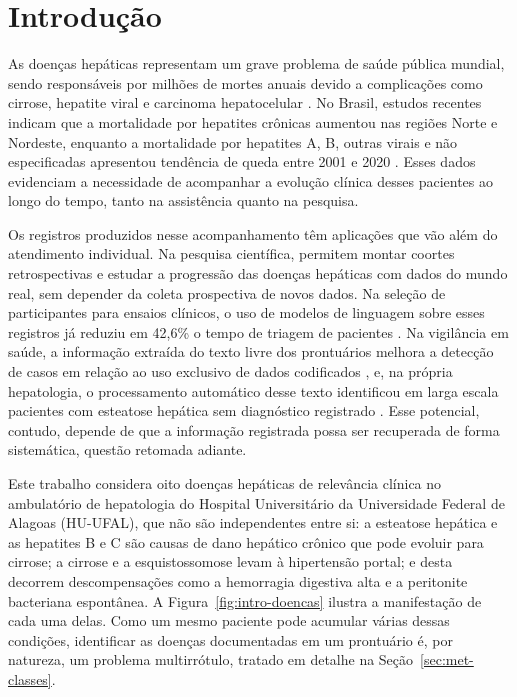 \chapter{Introdução}\label{cap:introducao}

As doenças hepáticas representam um grave problema de saúde pública mundial, sendo responsáveis por milhões de mortes anuais devido a complicações como cirrose, hepatite viral e carcinoma hepatocelular \citep{sousa2023}. No Brasil, estudos recentes indicam que a mortalidade por hepatites crônicas aumentou nas regiões Norte e Nordeste, enquanto a mortalidade por hepatites A, B, outras virais e não especificadas apresentou tendência de queda entre 2001 e 2020 \citep{sousa2023}. Esses dados evidenciam a necessidade de acompanhar a evolução clínica desses pacientes ao longo do tempo, tanto na assistência quanto na pesquisa.

Os registros produzidos nesse acompanhamento têm aplicações que vão além do atendimento individual. Na pesquisa científica, permitem montar coortes retrospectivas e estudar a progressão das doenças hepáticas com dados do mundo real, sem depender da coleta prospectiva de novos dados. Na seleção de participantes para ensaios clínicos, o uso de modelos de linguagem sobre esses registros já reduziu em 42,6\% o tempo de triagem de pacientes \citep{jin2024}. Na vigilância em saúde, a informação extraída do texto livre dos prontuários melhora a detecção de casos em relação ao uso exclusivo de dados codificados \citep{ford2016}, e, na própria hepatologia, o processamento automático desse texto identificou em larga escala pacientes com esteatose hepática sem diagnóstico registrado \citep{schneider2023}. Esse potencial, contudo, depende de que a informação registrada possa ser recuperada de forma sistemática, questão retomada adiante.

Este trabalho considera oito doenças hepáticas de relevância clínica no ambulatório de hepatologia do Hospital Universitário da Universidade Federal de Alagoas (HU-UFAL), que não são independentes entre si: a esteatose hepática e as hepatites B e C são causas de dano hepático crônico que pode evoluir para cirrose; a cirrose e a esquistossomose levam à hipertensão portal; e desta decorrem descompensações como a hemorragia digestiva alta e a peritonite bacteriana espontânea. A Figura~\ref{fig:intro-doencas} ilustra a manifestação de cada uma delas. Como um mesmo paciente pode acumular várias dessas condições, identificar as doenças documentadas em um prontuário é, por natureza, um problema multirrótulo, tratado em detalhe na Seção~\ref{sec:met-classes}.

